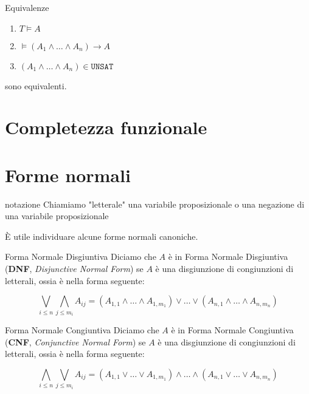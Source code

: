 \documentclass[a4paper,11pt]{report}
\begin{document}
        \begin{lemmabox}{Equivalenze}{}
            \begin{enumerate}
                \item \( T \vDash A \)
                \item \( \vDash (A_1 \land \dots \land A_n) \to A \)
                \item \( (A_1 \land \dots \land A_n) \in \texttt{UNSAT}\) 
            \end{enumerate}

                    sono equivalenti.
            
        \end{lemmabox}

        \section{Completezza funzionale}

        \section{Forme normali}

        \begin{gbox}{notazione}
            Chiamiamo "letterale" una variabile proposizionale o una negazione di una variabile proposizionale
        \end{gbox}

        È utile individuare alcune forme normali canoniche.

        \begin{defbox}{Forma Normale Disgiuntiva}{}
            Diciamo che \( A \) è in Forma Normale Disgiuntiva (\textbf{DNF}, \textit{Disjunctive Normal Form}) se \( A \) è una disgiunzione di congiunzioni di letterali, ossia è nella forma seguente:

            \[ \bigvee_{i\leq n} \bigwedge_{j\leq m_i} A_{ij} = (A_{1,1} \land \dots \land A_{1, m_1}) \lor \dots \lor (A_{n,1} \land \dots \land A_{n, m_n}) \]

        \end{defbox}

        \begin{defbox}{Forma Normale Congiuntiva}{}
            Diciamo che \( A \) è in Forma Normale Congiuntiva (\textbf{CNF}, \textit{Conjunctive Normal Form}) se \( A \) è una disgiunzione di congiunzioni di letterali, ossia è nella forma seguente:

            \[ \bigwedge_{i\leq n} \bigvee_{j\leq m_i} A_{ij} = (A_{1,1} \lor \dots \lor A_{1, m_1}) \land \dots \land (A_{n,1} \lor \dots \lor A_{n, m_n}) \]

        \end{defbox}
\end{document}
